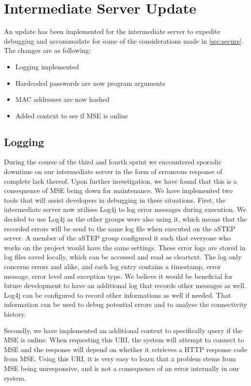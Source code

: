 \section{Intermediate Server Update}
An update has been implemented for the intermediate server to expedite debugging and accommodate for some of the considerations made in \cref{sec:secure}. The changes are as following:
\begin{itemize}
\item Logging implemented
\item Hardcoded passwords are now program arguments
\item MAC addresses are now hashed
\item Added context to see if MSE is online
\end{itemize}

\subsection*{Logging}
During the course of the third and fourth sprint we encountered sporadic downtime on our intermediate server in the form of erroneous response of complete lack thereof. Upon further investigation, we have found that this is a consequence of MSE being down for maintenance. We have implemented two tools that will assist developers in debugging in these situations.
First, the intermediate server now utilises Log4j \cite{log4j} to log error messages during execution. We decided to use Log4j as the other groups were also using it, which means that the recorded errors will be send to the same log file when executed on the aSTEP server. A member of the aSTEP group configured it such that everyone who works on the project would have the same settings. These error logs are stored in log files saved locally, which can be accessed and read as cleartext. The log only concerns errors and alike, and each log entry contains a timestamp, error message, error level and exception type. We believe it would be beneficial for future development to have an additional log that records other messages as well. Log4j can be configured to record other informations as well if needed. That information can be used to 	debug potential errors and to analyse the connectivity history.

Secondly, we have implemented an additional context to specifically query if the MSE is online. When requesting this URI, the system will attempt to connect to MSE and the response will depend on whether it retrieves a HTTP response code from MSE. Using this URI, it is very easy to learn that a problem stems from MSE being unresponsive, and is not a consequence of an error internally in our system.

